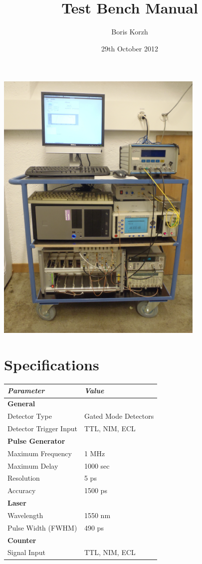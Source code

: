 \documentclass{article}
\title{Test Bench Manual}
\author{Boris Korzh}
\date{29th October 2012}
\begin{document}
\maketitle
\begin{center}
\includegraphics[width=10cm]{images/testbench1.JPG}
\end{center}


\section{Specifications}
\begin{center}
\begin{tabular}{ | l | l |  }
\hline
\emph{Parameter} & \emph{Value} \\ \hline
{\bf General } &   \\ \hline
Detector Type & Gated Mode Detectors \\ \hline
Detector Trigger Input & TTL, NIM, ECL \\ \hline

{\bf Pulse Generator } &   \\ \hline
Maximum Frequency & 1 MHz  \\ \hline
Maximum Delay & 1000 sec  \\ \hline
Resolution & 5 ps  \\ \hline
Accuracy & 1500 ps  \\ \hline

\bf{Laser} & \\ \hline
Wavelength & 1550 nm \\ \hline
Pulse Width (FWHM) & 490 ps \\ \hline
\bf{Counter} & \\ \hline

Signal Input & TTL, NIM, ECL \\ \hline
\end{tabular}
\end{center}
\end{document}
